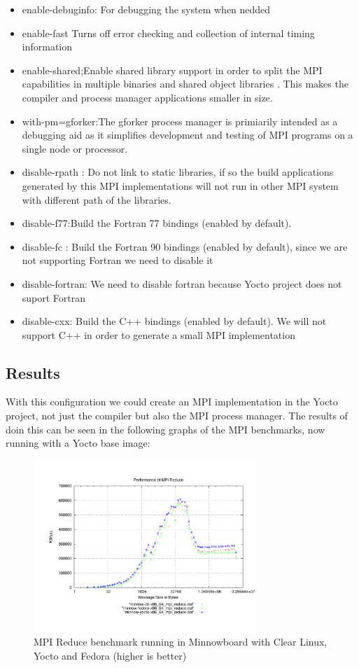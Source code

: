 \begin{itemize}
\item enable-debuginfo: For debugging the system when nedded
\item enable-fast Turns off error checking and collection of internal timing
information
\item enable-shared;Enable shared library support in order to split the MPI
capabilities in multiple binaries and shared object libraries . This makes the
compiler and process manager applications smaller in size.
\item with-pm=gforker:The gforker process manager is primiarily intended as a
debugging aid as it simplifies development and testing of MPI programs on a
single node or processor.
\item disable-rpath : Do not link to static libraries, if so the build
applications generated by this MPI implementations will not run in other MPI
system with different path of the libraries.
\item disable-f77:Build the Fortran 77 bindings (enabled by default).
\item disable-fc : Build the Fortran 90 bindings (enabled by default), since we
are not supporting Fortran we need to disable it 
\item disable-fortran: We need to disable fortran because Yocto project does
not suport Fortran
\item disable-cxx: Build the C++ bindings (enabled by default). We will not
support C++ in order to generate a small MPI implementation
\end{itemize}


\subsection{Results}

With this configuration we could create an MPI implementation in the Yocto
project, not just the compiler but also the MPI process manager. The results of
doin this can be seen in the following graphs of the MPI benchmarks, now
running with a Yocto base image: 

\begin{figure}[H]
\centering
\includegraphics[width=0.75\textwidth]{images/mpbench_yocto_experiments/mpi_reduce.pdf}
\caption{MPI Reduce benchmark running in Minnowboard with Clear Linux, Yocto
and Fedora (higher is better)}
\label{mpi_reduce_yocto}
\end{figure}

